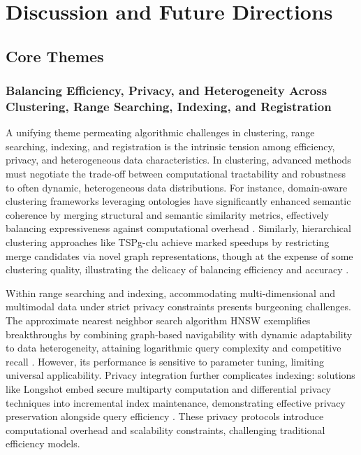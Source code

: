 \documentclass[sigconf]{acmart}
\begin{document}
\section{Discussion and Future Directions}

\subsection{Core Themes}

\subsubsection{Balancing Efficiency, Privacy, and Heterogeneity Across Clustering, Range Searching, Indexing, and Registration}

A unifying theme permeating algorithmic challenges in clustering, range searching, indexing, and registration is the intrinsic tension among efficiency, privacy, and heterogeneous data characteristics. In clustering, advanced methods must negotiate the trade-off between computational tractability and robustness to often dynamic, heterogeneous data distributions. For instance, domain-aware clustering frameworks leveraging ontologies have significantly enhanced semantic coherence by merging structural and semantic similarity metrics, effectively balancing expressiveness against computational overhead \cite{ref23}. Similarly, hierarchical clustering approaches like TSPg-clu achieve marked speedups by restricting merge candidates via novel graph representations, though at the expense of some clustering quality, illustrating the delicacy of balancing efficiency and accuracy \cite{ref28}.

Within range searching and indexing, accommodating multi-dimensional and multimodal data under strict privacy constraints presents burgeoning challenges. The approximate nearest neighbor search algorithm HNSW exemplifies breakthroughs by combining graph-based navigability with dynamic adaptability to data heterogeneity, attaining logarithmic query complexity and competitive recall \cite{ref4}. However, its performance is sensitive to parameter tuning, limiting universal applicability. Privacy integration further complicates indexing: solutions like Longshot embed secure multiparty computation and differential privacy techniques into incremental index maintenance, demonstrating effective privacy preservation alongside query efficiency \cite{ref31}. These privacy protocols introduce computational overhead and scalability constraints, challenging traditional efficiency models.
\end{document}
